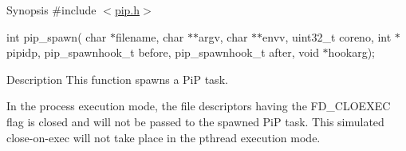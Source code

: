 \begin{DoxyParagraph}{Synopsis}
\#include $<$\hyperlink{pip_8h_source}{pip.\-h}$>$ \par
int pip\-\_\-spawn( char $\ast$filename, char $\ast$$\ast$argv, char $\ast$$\ast$envv, uint32\-\_\-t coreno, int $\ast$pipidp, pip\-\_\-spawnhook\-\_\-t before, pip\-\_\-spawnhook\-\_\-t after, void $\ast$hookarg);
\end{DoxyParagraph}
\begin{DoxyParagraph}{Description}
This function spawns a Pi\-P task. 
\end{DoxyParagraph}
\begin{DoxyParagraph}{}
In the process execution mode, the file descriptors having the {\ttfamily F\-D\-\_\-\-C\-L\-O\-E\-X\-E\-C} flag is closed and will not be passed to the spawned Pi\-P task. This simulated close-\/on-\/exec will not take place in the pthread execution mode.
\end{DoxyParagraph}


